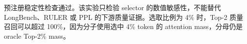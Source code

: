 \begin{table}[t]
\caption{冻结 $\lambda=0.75$ 相对五个候选 shrinkage 中最优值的 regret。}
\label{tab:shrinkage-regret}
\centering\small
{}
\end{table}

预注册稳定性检查通过。该实验只检验 selector 的数值敏感性，不能替代 LongBench、RULER 或 PPL 的下游质量证据。选取比例为 4\% 时，Top-2 质量召回可以超过 100\%，因为分子使用选中 4\% token 的 attention mass，分母仍是 oracle Top-2\% mass。
